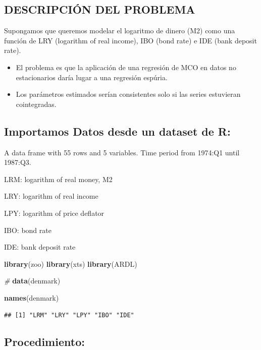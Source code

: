 \documentclass[
]{book}
\newenvironment{Shaded}{\begin{snugshade}}{\end{snugshade}}
\newcommand{\CommentTok}[1]{\textcolor[rgb]{0.56,0.35,0.01}{\textit{#1}}}
\newcommand{\FunctionTok}[1]{\textcolor[rgb]{0.13,0.29,0.53}{\textbf{#1}}}
\newcommand{\NormalTok}[1]{#1}
\begin{document}
\hypertarget{descripciuxf3n-del-problema}{%
\subsection{DESCRIPCIÓN DEL PROBLEMA}\label{descripciuxf3n-del-problema}}

Supongamos que queremos modelar el logaritmo de dinero (M2) como una función de LRY (logarithm of real income), IBO (bond rate) e IDE (bank deposit rate).

\begin{itemize}
\item
  El problema es que la aplicación de una regresión de MCO en datos no estacionarios daría lugar a una regresión espúria.
\item
  Los parámetros estimados serían consistentes solo si las series estuvieran cointegradas.
\end{itemize}

\hypertarget{importamos-datos-desde-un-dataset-de-r}{%
\subsection{Importamos Datos desde un dataset de R:}\label{importamos-datos-desde-un-dataset-de-r}}

A data frame with 55 rows and 5 variables. Time period from 1974:Q1 until 1987:Q3.

LRM: logarithm of real money, M2

LRY: logarithm of real income

LPY: logarithm of price deflator

IBO: bond rate

IDE: bank deposit rate

\begin{Shaded}
\begin{Highlighting}[]
\FunctionTok{library}\NormalTok{(zoo) }
\FunctionTok{library}\NormalTok{(xts) }
\FunctionTok{library}\NormalTok{(ARDL)}

\CommentTok{\#}
\FunctionTok{data}\NormalTok{(denmark)}

\FunctionTok{names}\NormalTok{(denmark)}
\end{Highlighting}
\end{Shaded}

\begin{verbatim}
## [1] "LRM" "LRY" "LPY" "IBO" "IDE"
\end{verbatim}

\hypertarget{procedimiento}{%
\subsection{Procedimiento:}\label{procedimiento}}
\end{document}

